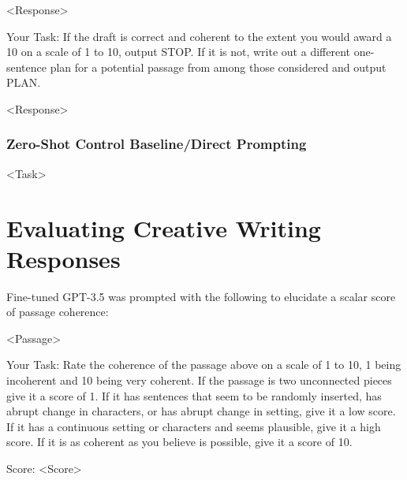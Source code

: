 \documentclass[11pt]{article}
\begin{document}
<Response>

Your Task: If the draft is correct and coherent to the extent you would award a 10 on a scale of 1 to 10, output STOP. If it is not, write out a different one-sentence plan for a potential passage from among those considered and output PLAN.

<Response>

\subsubsection*{Zero-Shot Control Baseline/Direct Prompting}

<Task>

\clearpage
\newpage

\section{Evaluating Creative Writing Responses}
\label{sec:evaluating_creative_writing}

Fine-tuned GPT-3.5 was prompted with the following to elucidate a scalar score of passage coherence:

<Passage>

Your Task: Rate the coherence of the passage above on a scale of 1 to 10, 1 being incoherent and 10 being very coherent. If the passage is two unconnected pieces give it a score of 1. If it has sentences that seem to be randomly inserted, has abrupt change in characters, or has abrupt change in setting, give it a low score. If it has a continuous setting or characters and seems plausible, give it a high score. If it is as coherent as you believe is possible, give it a score of 10.

Score: <Score>
\end{document}
